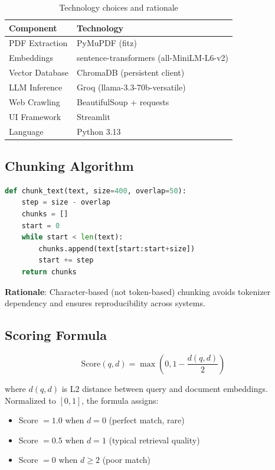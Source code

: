 \documentclass[11pt,a4paper]{article}
\begin{document}
\begin{table}[H]
\centering
\small
\begin{tabular}{ll}
\toprule
\textbf{Component} & \textbf{Technology} \\
\midrule
PDF Extraction & PyMuPDF (fitz) \\
Embeddings & sentence-transformers (all-MiniLM-L6-v2) \\
Vector Database & ChromaDB (persistent client) \\
LLM Inference & Groq (llama-3.3-70b-versatile) \\
Web Crawling & BeautifulSoup + requests \\
UI Framework & Streamlit \\
Language & Python 3.13 \\
\bottomrule
\end{tabular}
\caption{Technology choices and rationale}
\label{tab:stack}
\end{table}

\subsection{Chunking Algorithm}

\begin{lstlisting}[language=Python, caption={Fixed-size overlapping chunking}]
def chunk_text(text, size=400, overlap=50):
    step = size - overlap
    chunks = []
    start = 0
    while start < len(text):
        chunks.append(text[start:start+size])
        start += step
    return chunks
\end{lstlisting}

\textbf{Rationale}: Character-based (not token-based) chunking avoids tokenizer dependency and ensures reproducibility across systems.

\subsection{Scoring Formula}

\[
\text{Score}(q, d) = \max\left(0, 1 - \frac{d(q, d)}{2}\right)
\]

where $d(q, d)$ is L2 distance between query and document embeddings. Normalized to $[0, 1]$, the formula assigns:
\begin{itemize}
    \item Score $= 1.0$ when $d = 0$ (perfect match, rare)
    \item Score $= 0.5$ when $d = 1$ (typical retrieval quality)
    \item Score $= 0$ when $d \geq 2$ (poor match)
\end{itemize}
\end{document}
